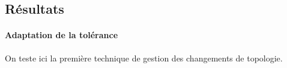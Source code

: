 \documentclass[11pt,a4paper]{article}
\begin{document}
\subsection{Résultats}



\paragraph{Adaptation de la tolérance}
On teste ici la première technique de gestion des changements de topologie.

%
%
%
\end{document}
